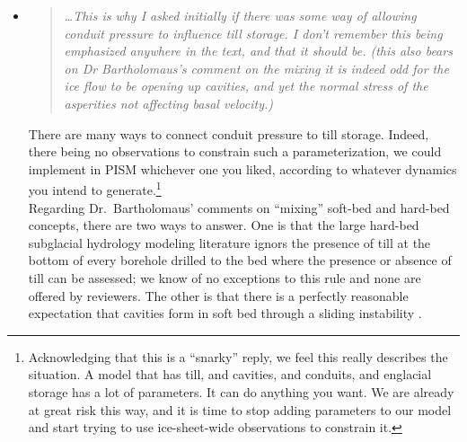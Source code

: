\documentclass[11pt,reqno]{amsart}
\newcommand{\reply}[2]{
\medskip\medskip
\item  \begin{quote}
\emph{#1}
\end{quote}

\medskip
\noindent #2}
\begin{document}
\begin{itemize}
\reply{\dots  This is why I asked initially if there was some way of allowing conduit pressure to influence till storage.  I don't remember this being emphasized anywhere in the text, and that it should be. (this also bears on Dr Bartholomaus's comment on the mixing it is indeed odd for the ice flow to be opening up cavities, and yet the normal stress of the asperities not affecting basal velocity.)}
{There are many ways to connect conduit pressure to till storage.  Indeed, there being no observations to constrain such a parameterization, we could implement in PISM whichever one you liked, according to whatever dynamics you intend to generate.\footnote{Acknowledging that this is a ``snarky'' reply, we feel this really describes the situation.  A model that has till, and cavities, and conduits, and englacial storage has a lot of parameters.  It can do anything you want.  We are already at great risk this way, and it is time to stop adding parameters to our model and start trying to use ice-sheet-wide observations to constrain it.} \\
\indent Regarding Dr.~Bartholomaus' comments on ``mixing'' soft-bed and hard-bed concepts, there are two ways to answer.  One is that the large hard-bed subglacial hydrology modeling literature ignors the presence of till at the bottom of every borehole drilled to the bed where the presence or absence of till can be assessed; we know of no exceptions to this rule and none are offered by reviewers.  The other is that there is a perfectly reasonable expectation that cavities form in soft bed through a sliding instability \cite{Schoof2007deformable}.}
\end{itemize}
\end{document}
